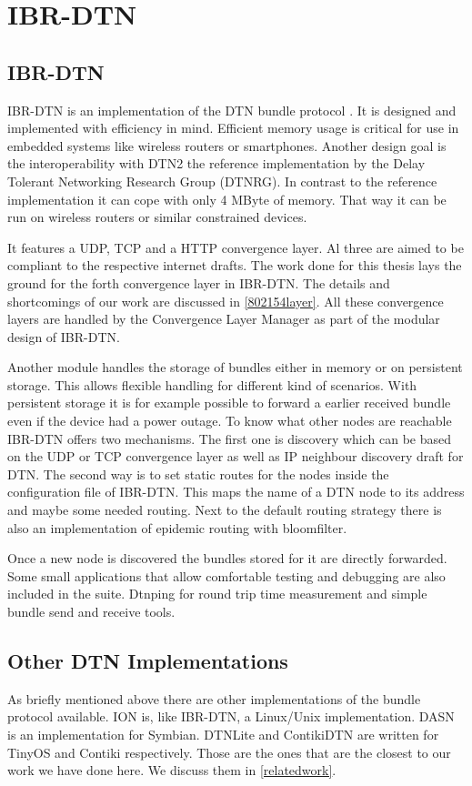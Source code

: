 \chapter{IBR-DTN}
\label{ibr-dtn}
\section{IBR-DTN}

IBR-DTN is an implementation of the DTN bundle protocol \cite{RFC5050}. It is
designed and implemented with efficiency in mind. Efficient memory usage is critical
for use in embedded systems like wireless routers or smartphones. Another design
goal is the interoperability with DTN2 the reference implementation by the Delay
Tolerant Networking Research Group (DTNRG). In contrast to the reference
implementation it can cope with only 4 MByte of memory. That way it can be run
on wireless routers or similar constrained devices.

It features a UDP, TCP and a HTTP convergence layer. Al three are aimed to be
compliant to the respective internet drafts. The work done for this thesis lays
the ground for the forth convergence layer in IBR-DTN. The details and
shortcomings of our work are discussed in \ref{802154layer}. All these
convergence layers are handled by the Convergence Layer Manager as part of the
modular design of IBR-DTN.

Another module handles the storage of bundles either in memory or on persistent
storage. This allows flexible handling for different kind of scenarios. With
persistent storage it is for example possible to forward a earlier received bundle
even if the device had a power outage. To know what other nodes are reachable
IBR-DTN offers two mechanisms. The first one is discovery which can be based on
the UDP or TCP convergence layer as well as IP neighbour discovery draft for
DTN. The second way is to set static routes for the nodes inside the
configuration file of IBR-DTN. This maps the name of a DTN node to its address
and maybe some needed routing. Next to the default routing strategy there is
also an implementation of epidemic routing with bloomfilter.

Once a new node is discovered the bundles stored for it are directly forwarded.
Some small applications that allow comfortable testing and debugging are also
included in the suite. Dtnping for round trip time measurement and simple bundle
send and receive tools.

\section{Other DTN Implementations}

As briefly mentioned above there are other implementations of the bundle
protocol available. ION is, like IBR-DTN, a Linux/Unix implementation. DASN is
an implementation for Symbian. DTNLite and ContikiDTN are written for TinyOS and
Contiki respectively. Those are the ones that are the closest to our work we
have done here. We discuss them in \ref{relatedwork}.
